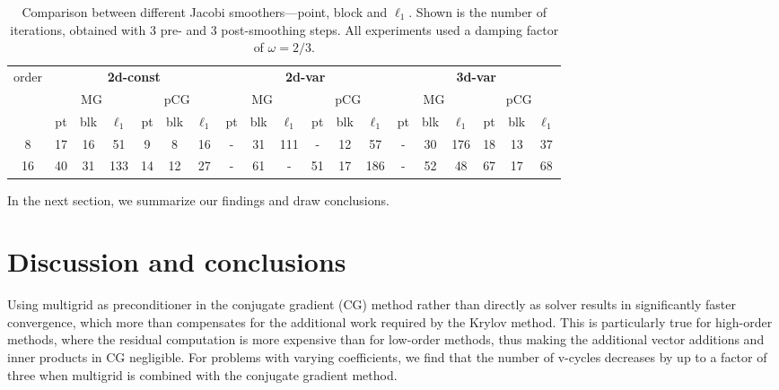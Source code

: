\documentclass[times]{nlaauth}
\begin{document}
\begin{table}\centering
	\caption{\label{tab:block-jac} Comparison between different Jacobi
          smoothers---point, block and $\ell_1$. Shown is the number of
          iterations, obtained with 3
          pre- and 3 post-smoothing steps. All experiments used a damping factor of $\omega=2/3$.}
\begin{tabular}{|c|c|c|c|c|c|c|c|c|c|c|c|c|c|c|c|c|c|c|}
	\hline
	order & \multicolumn{6}{c|}{\bf 2d-const} &
        \multicolumn{6}{c|}{\bf 2d-var} & \multicolumn{6}{c|}{\bf 3d-var} \\
	\cline{2-19}
  & \multicolumn{3}{c|}{MG} & \multicolumn{3}{c|}{pCG} &\multicolumn{3}{c|}{MG} & \multicolumn{3}{c|}{pCG}  & \multicolumn{3}{c|}{MG} & \multicolumn{3}{c|}{pCG}  \\
	\hline
	 & {\tiny pt} & {\tiny blk} & {\tiny $\ell_1$} & {\tiny pt} & {\tiny blk} & {\tiny $\ell_1$} & {\tiny pt} & {\tiny blk} & {\tiny $\ell_1$} & {\tiny pt} & {\tiny blk} & {\tiny $\ell_1$}& {\tiny pt} & {\tiny blk} & {\tiny $\ell_1$}& {\tiny pt} & {\tiny blk} & {\tiny $\ell_1$}\\
  \hline \small
  8  & 17 & 16 & 51 & 9  &  8 & 16 & - & 31 & 111 & - & 12 & 57 & - & 30 & 176 & 18 & 13 & 37 \\    %
  16 & 40 & 31 & 133 & 14 & 12 & 27 & - & 61 & - & 51 & 17 & 186 & - & 52 & 48 & 67 & 17 & 68  \\   %
  \hline
\end{tabular}
\end{table}
In the next section, we summarize our findings and draw conclusions.

\section{Discussion and conclusions}
\label{sec:discuss}



Using multigrid as preconditioner in the conjugate gradient (CG)
method rather than directly as solver results in significantly faster
convergence, which more than compensates for the additional work
required by the Krylov method.  This is particularly true for
high-order methods, where the residual computation is more expensive
than for low-order methods, thus making the additional vector
additions and inner products in CG negligible.  For problems with
varying coefficients, we find that the number of v-cycles
decreases by up to a factor of three when multigrid is combined with
the conjugate gradient method.
\end{document}
